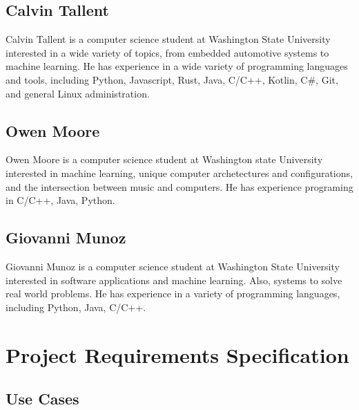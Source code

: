 \subsection{Calvin Tallent}
Calvin Tallent is a computer science student at Washington State University
interested in a wide variety of topics, from embedded automotive systems to
machine learning. He has experience in a wide variety of programming languages
and tools, including Python, Javascript, Rust, Java, C/C++, Kotlin, C\#, Git,
and general Linux administration.


\subsection{Owen Moore}
Owen Moore is a computer science student at Washington state University
interested in machine learning, unique computer archetectures and configurations,
and the intersection between music and computers. He has experience programing in C/C++, Java, Python.\par
\subsection{Giovanni Munoz}
Giovanni Munoz is a computer science student at Washington State University
interested in software applications and machine learning. Also, systems to solve real world problems.
He has experience in a variety of programming languages, including Python, Java, C/C++.

\par




\section{Project Requirements Specification}

\subsection{Use Cases}

